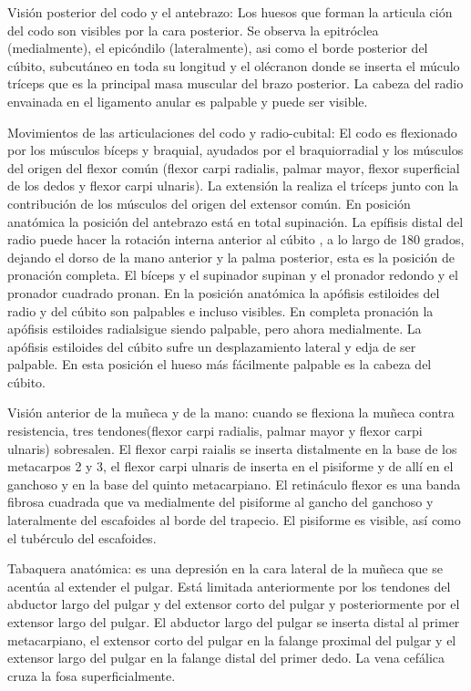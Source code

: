 \documentclass[a4paper,12pt]{article} %
\begin{document}
Visión posterior del codo y el antebrazo: Los huesos que forman la articula ción del codo son visibles por la cara posterior. Se observa la epitróclea (medialmente), el epicóndilo (lateralmente), asi como el borde posterior del cúbito, subcutáneo en toda su longitud y el olécranon donde se inserta el múculo tríceps que es la principal masa muscular del brazo posterior. La cabeza del radio envainada en el ligamento anular es palpable y puede ser visible.

Movimientos de las articulaciones del codo y radio-cubital: El codo es flexionado por los músculos bíceps y braquial, ayudados por el braquiorradial y los músculos del origen del flexor común (flexor carpi radialis, palmar mayor, flexor superficial de los dedos y flexor carpi ulnaris). La extensión la realiza el tríceps junto con la contribución de los músculos del origen del extensor común.
En posición anatómica la posición del antebrazo está en total supinación. La epífisis distal del radio puede hacer la rotación interna anterior al cúbito , a lo largo de 180 grados, dejando el dorso de la mano anterior y la palma posterior, esta es la posición de pronación completa. El bíceps y el supinador supinan y el pronador redondo y el pronador cuadrado pronan.
En la posición anatómica la apófisis estiloides del radio y del cúbito son palpables e incluso visibles. En completa pronación la apófisis estiloides radialsigue siendo palpable, pero ahora medialmente. La apófisis estiloides del cúbito sufre un desplazamiento lateral y edja de ser palpable. En esta posición el hueso más fácilmente palpable es la cabeza del cúbito.

Visión anterior de la muñeca y de la mano: cuando se flexiona la muñeca contra resistencia, tres tendones(flexor carpi radialis, palmar mayor y flexor carpi ulnaris) sobresalen. El flexor carpi raialis se inserta distalmente en la base de los metacarpos 2 y 3, el flexor carpi ulnaris de inserta en el pisiforme y de allí en el ganchoso y en la base del quinto metacarpiano.
El retináculo flexor es una banda fibrosa cuadrada que va medialmente del pisiforme al gancho del ganchoso y lateralmente del escafoides al borde del trapecio. El pisiforme es visible, así como el tubérculo del escafoides.

Tabaquera anatómica: es una depresión en la cara lateral de la muñeca que se acentúa al extender el pulgar. Está limitada anteriormente por los tendones del abductor largo del pulgar y del extensor corto del pulgar y posteriormente por el extensor largo del pulgar. 
El abductor largo del pulgar se inserta distal al primer metacarpiano, el extensor corto del pulgar en la falange proximal del pulgar y el extensor largo del pulgar en la falange distal del primer dedo. La vena cefálica cruza la fosa superficialmente.
\end{document}
